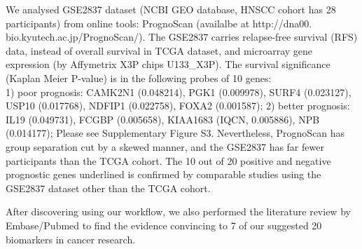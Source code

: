 \documentclass[preprint,12pt]{elsarticle}
\newenvironment{MyColorPar}[1]{%
    \leavevmode\color{#1}\ignorespaces%
}{%
}%
\begin{document}
\begin{MyColorPar}{blue}
We analysed GSE2837 dataset (NCBI GEO database\cite{Chung2006}, HNSCC cohort has 28 participants) from online tools: PrognoScan (availalbe at http://dna00.\\bio.kyutech.ac.jp/PrognoScan/)\cite{Mizuno2009a}.
The GSE2837 carries %
relapse-free survival (RFS) data, instead of overall survival in TCGA dataset,
and microarray gene expression (by Affymetrix X3P chips U133\_X3P).
The survival significance (Kaplan Meier P-value) is in the following probes of 10 genes:\\
1) poor prognosis: CAMK2N1 (0.048214), PGK1 (0.009978), SURF4 (0.023127), USP10 (0.017768), NDFIP1 (0.022758), FOXA2 (0.001587); %
2) better prognosis: IL19 (0.049731), FCGBP (0.005658), KIAA1683 (IQCN, 0.005886), NPB (0.014177);
Please see Supplementary Figure S3. %
Nevertheless, PrognoScan has group separation cut by a skewed manner, and the GSE2837 has far fewer participants than the TCGA cohort.
The 10 out of 20 positive and negative prognostic genes underlined is confirmed by comparable studies using the GSE2837 dataset other than the TCGA cohort.



After discovering using our workflow, we also performed the literature review by Embase/Pubmed to find the evidence convincing to 7 of our suggested 20 biomarkers in cancer research.


\end{MyColorPar}
\end{document}
